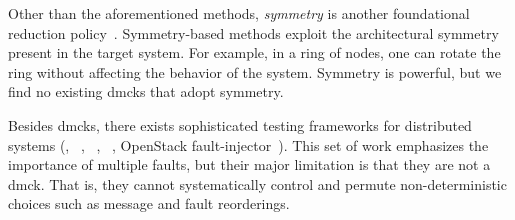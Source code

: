 Other than the aforementioned methods, {\em symmetry} is another
foundational reduction policy~\cite{Emerson+97-PorAndSym,
  Prasad+00-SymBasedMc}.  Symmetry-based methods exploit the
architectural symmetry present in the target system.  For example, in
a ring of nodes, one can rotate the ring without affecting
the behavior of the system.  Symmetry is powerful, but
we find no existing dmcks that adopt symmetry.

Besides dmcks, there exists sophisticated testing frameworks for
distributed systems (\eg, \fate~\cite{Gunawi+11-FateDestini},
\prefail~\cite{Joshi+11-PreFail},
\setsudo~\cite{Joshi+13-SetsudoTesting}, OpenStack
fault-injector~\cite{Ju+13-FaultResOpenStack}). This set of work
emphasizes the importance of multiple faults, but their major
limitation is that they are not a dmck.  That is, they cannot
systematically control and permute non-deterministic choices such as
message and fault reorderings.
